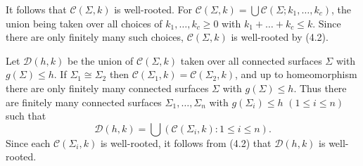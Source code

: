 It follows that $\mathcal{C}(\Sigma, k)$ is well-rooted. For $\mathcal{C}(\Sigma, k) = \bigcup \mathcal{C}(\Sigma; k_1, \dots, k_c)$, the union being taken over all choices of $k_1, \dots, k_c \ge 0$ with $k_1 + \dots + k_c \le k$. Since there are only finitely many such choices, $\mathcal{C}(\Sigma, k)$ is well-rooted by (4.2).

Let $\mathcal{D}(h, k)$ be the union of $\mathcal{C}(\Sigma, k)$ taken over all connected surfaces $\Sigma$ with $g(\Sigma) \le h$. If $\Sigma_1 \cong \Sigma_2$ then $\mathcal{C}(\Sigma_1, k) = \mathcal{C}(\Sigma_2, k)$, and up to homeomorphism there are only finitely many connected surfaces $\Sigma$ with $g(\Sigma) \le h$. Thus there are finitely many connected surfaces $\Sigma_1, \dots, \Sigma_n$ with $g(\Sigma_i) \le h$ $(1 \le i \le n)$ such that
\begin{equation*}
\mathcal{D}(h, k) = \bigcup (\mathcal{C}(\Sigma_i, k) \colon 1 \le i \le n).
\end{equation*}
Since each $\mathcal{C}(\Sigma_i, k)$ is well-rooted, it follows from (4.2) that $\mathcal{D}(h, k)$ is well-rooted.
